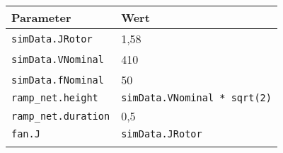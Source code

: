\begin{longtable}[]{@{}ll@{}}
\toprule
\begin{minipage}[b]{0.37\columnwidth}\raggedright
Parameter\strut
\end{minipage} & \begin{minipage}[b]{0.58\columnwidth}\raggedright
Wert\strut
\end{minipage}\tabularnewline
\midrule
\endhead
\begin{minipage}[t]{0.37\columnwidth}\raggedright
\texttt{simData.JRotor}\strut
\end{minipage} & \begin{minipage}[t]{0.58\columnwidth}\raggedright
1,58\strut
\end{minipage}\tabularnewline
\begin{minipage}[t]{0.37\columnwidth}\raggedright
\texttt{simData.VNominal}\strut
\end{minipage} & \begin{minipage}[t]{0.58\columnwidth}\raggedright
410\strut
\end{minipage}\tabularnewline
\begin{minipage}[t]{0.37\columnwidth}\raggedright
\texttt{simData.fNominal}\strut
\end{minipage} & \begin{minipage}[t]{0.58\columnwidth}\raggedright
50\strut
\end{minipage}\tabularnewline
\begin{minipage}[t]{0.37\columnwidth}\raggedright
\texttt{ramp\_net.height}\strut
\end{minipage} & \begin{minipage}[t]{0.58\columnwidth}\raggedright
\texttt{simData.VNominal\ *\ sqrt(2)}\strut
\end{minipage}\tabularnewline
\begin{minipage}[t]{0.37\columnwidth}\raggedright
\texttt{ramp\_net.duration}\strut
\end{minipage} & \begin{minipage}[t]{0.58\columnwidth}\raggedright
0,5\strut
\end{minipage}\tabularnewline
\begin{minipage}[t]{0.37\columnwidth}\raggedright
\texttt{fan.J}\strut
\end{minipage} & \begin{minipage}[t]{0.58\columnwidth}\raggedright
\texttt{simData.JRotor}\strut
\end{minipage}\tabularnewline
\begin{minipage}[t]{0.37\columnwidth}\raggedright

\end{minipage}
\end{longtable}

